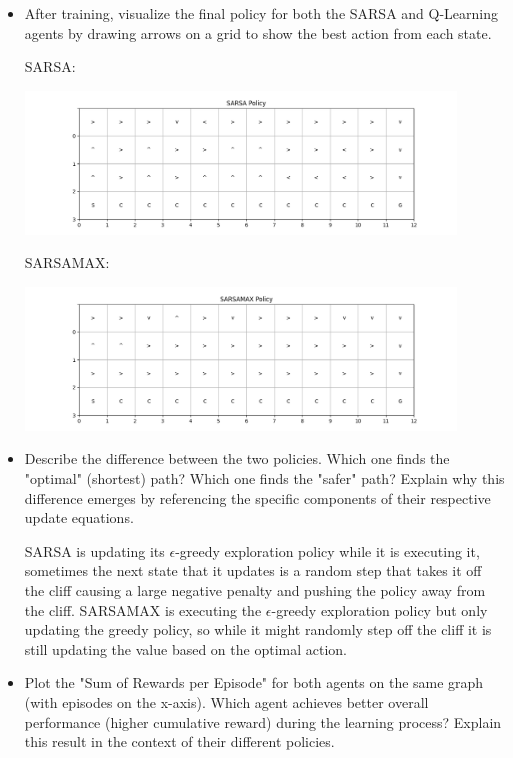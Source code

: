\documentclass{article}
\begin{document}
\begin{itemize}
    \item After training, visualize the final policy for both the SARSA and Q-Learning agents by drawing arrows on a grid to show the best action from each state.
    
    SARSA:

    \includegraphics[width=0.9\textwidth]{sarsaGrid.png}

    SARSAMAX:

    \includegraphics[width=0.9\textwidth]{sarsaMaxGrid.png}
    
    \item Describe the difference between the two policies. Which one finds the "optimal" (shortest) path? Which one finds the "safer" path? Explain why this difference emerges by referencing the specific components of their respective update equations.
    
    SARSA is updating its $\epsilon$-greedy exploration policy while it is executing it, sometimes the next state that it updates is a random step that takes it off the cliff causing a large negative penalty and pushing the policy away from the cliff.
    SARSAMAX is executing the $\epsilon$-greedy exploration policy but only updating the greedy policy, so while it might randomly step off the cliff it is still updating the value based on the optimal action.
    
    \item Plot the "Sum of Rewards per Episode" for both agents on the same graph (with episodes on the x-axis). Which agent achieves better overall performance (higher cumulative reward) during the learning process? Explain this result in the context of their different policies.
    

\end{itemize}
\end{document}
